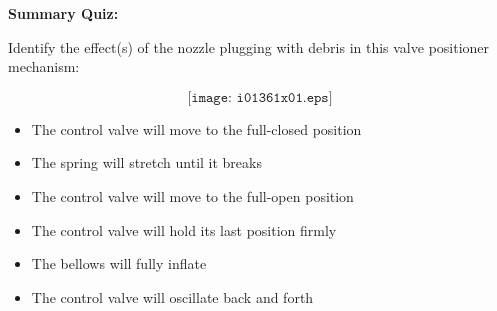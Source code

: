 \vfil \eject

\noindent
{\bf Summary Quiz:}

Identify the effect(s) of the nozzle plugging with debris in this valve positioner mechanism:

$$\texttt{[image: i01361x01.eps]}$$

\begin{itemize}
\item{} The control valve will move to the full-closed position 
\vskip 5pt 
\item{} The spring will stretch until it breaks
\vskip 5pt 
\item{} The control valve will move to the full-open position
\vskip 5pt 
\item{} The control valve will hold its last position firmly
\vskip 5pt 
\item{} The bellows will fully inflate
\vskip 5pt 
\item{} The control valve will oscillate back and forth 
\end{itemize}




